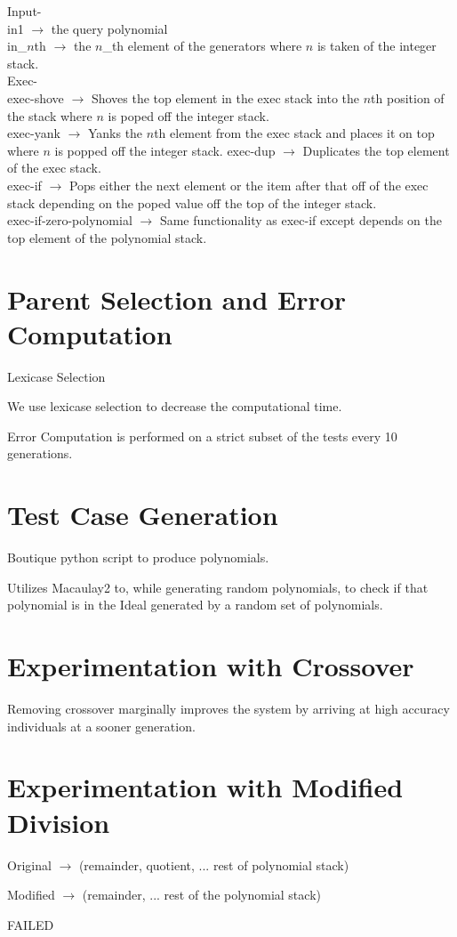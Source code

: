 \documentclass{article}
\begin{document}
\noindent Input- \\
\indent in1 $\rightarrow$ the query polynomial \\
\indent in\_$n$th $\rightarrow$ the $n$\_th element of the generators where $n$ is taken of the integer stack. \\

\noindent Exec- \\
\indent exec-shove $\rightarrow$ Shoves the top element in the exec stack into the $n$th position of the stack where $n$ is poped off the integer stack. \\
\indent exec-yank $\rightarrow$ Yanks the $n$th element from the exec stack and places it on top where $n$ is popped off the integer stack.
\indent exec-dup $\rightarrow$ Duplicates the top element of the exec stack. \\
\indent exec-if $\rightarrow$ Pops either the next element or the item after that off of the exec stack depending on the poped value off the top of the integer stack. \\
\indent exec-if-zero-polynomial $\rightarrow$ Same functionality as exec-if except depends on the top element of the polynomial stack.


\newpage
\section*{Parent Selection and Error Computation}

Lexicase Selection

We use lexicase selection to decrease the computational time.

Error Computation is performed on a strict subset of the tests every 10 generations. 

\newpage
\section*{Test Case Generation}

Boutique python script to produce polynomials. 

Utilizes Macaulay2 to, while generating random polynomials, to check if that polynomial is in the Ideal generated by a random set of polynomials.

\newpage
\section*{Experimentation with Crossover}

Removing crossover marginally improves the system by arriving at high accuracy individuals at a sooner generation.

\newpage
\section*{Experimentation with Modified Division}

Original $\rightarrow$ (remainder, quotient, ... rest of polynomial stack)

Modified $\rightarrow$ (remainder, ... rest of the polynomial stack)

FAILED
\end{document}
